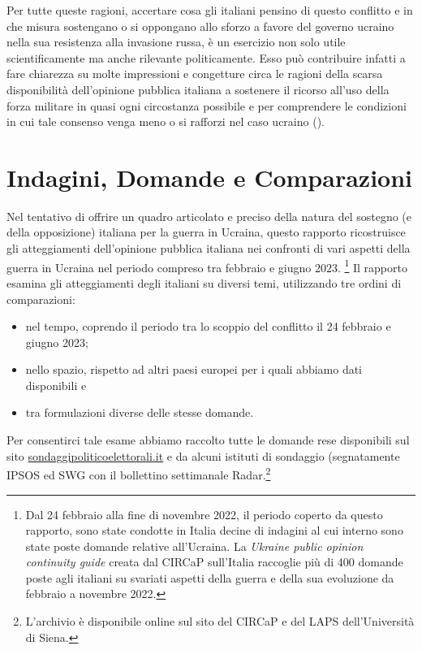 \documentclass[
]{book}
\begin{document}
Per tutte queste ragioni, accertare cosa gli italiani pensino di questo conflitto e in che misura sostengano o si oppongano allo sforzo a favore del governo ucraino nella sua resistenza alla invasione russa, è un esercizio non solo utile scientificamente ma anche rilevante politicamente. Esso può contribuire infatti a fare chiarezza su molte impressioni e congetture circa le ragioni della scarsa disponibilità dell'opinione pubblica italiana a sostenere il ricorso all'uso della forza militare in quasi ogni circostanza possibile e per comprendere le condizioni in cui tale consenso venga meno o si rafforzi nel caso ucraino (\citet{Everts-e-Isernia2015}).

\hypertarget{indagini-domande-e-comparazioni}{%
\section{Indagini, Domande e Comparazioni}\label{indagini-domande-e-comparazioni}}

Nel tentativo di offrire un quadro articolato e preciso della natura del sostegno (e della opposizione) italiana per la guerra in Ucraina, questo rapporto ricostruisce gli atteggiamenti dell'opinione pubblica italiana nei confronti di vari aspetti della guerra in Ucraina nel periodo compreso tra febbraio e giugno 2023. \footnote{Dal 24 febbraio alla fine di novembre 2022, il periodo coperto da questo rapporto, sono state condotte in Italia decine di indagini al cui interno sono state poste domande relative all'Ucraina. La \emph{Ukraine public opinion continuity guide} creata dal CIRCaP sull'Italia raccoglie più di 400 domande poste agli italiani su svariati aspetti della guerra e della sua evoluzione da febbraio a novembre 2022.} Il rapporto esamina gli atteggiamenti degli italiani su diversi temi, utilizzando tre ordini di comparazioni:

\begin{itemize}
\item
  nel tempo, coprendo il periodo tra lo scoppio del conflitto il 24 febbraio e giugno 2023;
\item
  nello spazio, rispetto ad altri paesi europei per i quali abbiamo dati disponibili e
\item
  tra formulazioni diverse delle stesse domande.
\end{itemize}

Per consentirci tale esame abbiamo raccolto tutte le domande rese disponibili sul sito \href{http://www.sondaggipoliticoelettorali.it/}{sondaggipoliticoelettorali.it} e da alcuni istituti di sondaggio (segnatamente IPSOS ed SWG con il bollettino settimanale Radar.\footnote{L'archivio è disponibile online sul sito del CIRCaP e del LAPS dell'Università di Siena.}
\end{document}
